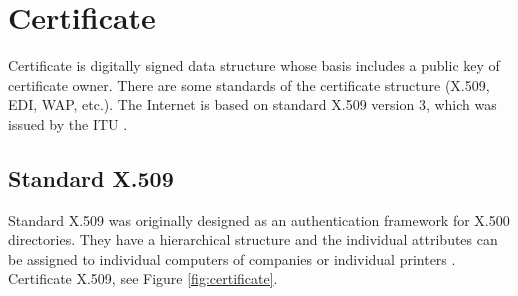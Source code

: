 \documentclass[
  twoside, 12pt, 
  printed, %
  notable,   %
  lof,     %
  lot,     %
]{fithesis3}
\begin{document}
\section{Certificate}
Certificate is digitally signed data structure whose basis includes a public key of
certificate owner. There are some standards of the certificate structure (X.509, EDI, WAP, 
etc.). The Internet is based on standard X.509 version 3, which was issued by the ITU \cite{dostalek2016velky}. %

\subsection{Standard X.509}
Standard X.509 was originally designed as an authentication framework for X.500 
directories. They have a hierarchical structure and the individual attributes can be assigned to 
individual computers of companies or individual printers \cite{schmeh2006cryptography}. %
Certificate X.509, see Figure \ref{fig:certificate}.
\end{document}
